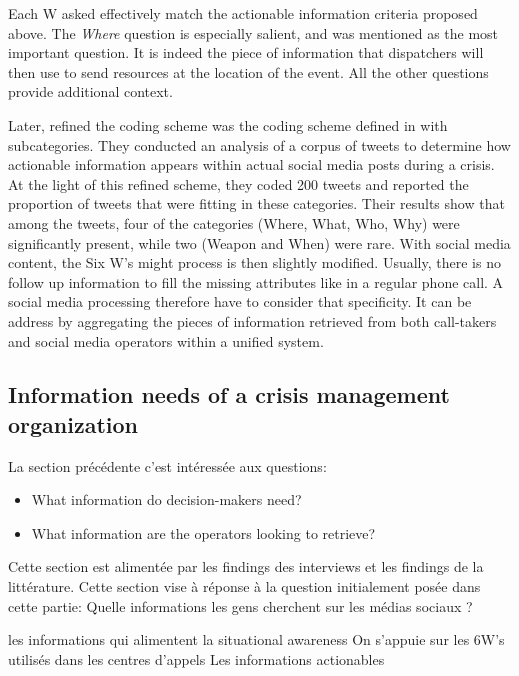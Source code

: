 Each W asked effectively match the actionable information criteria proposed above.
The \textit{Where} question is especially salient, and was mentioned as the most important question.
It is indeed the piece of information that dispatchers will then use to send resources at the location of the event.
All the other questions provide additional context.


Later, \textcite{kropczynskiRefiningCodingScheme2019} refined the coding scheme was the coding scheme defined in \textcite{kropczynskiIdentifyingActionableInformation2018} with subcategories.
They conducted an analysis of a corpus of tweets to determine how actionable information appears within actual social media posts during a crisis.
At the light of this refined scheme, they coded 200 tweets and reported the proportion of tweets that were fitting in these categories.
Their results show that among the tweets, four of the categories (Where, What, Who, Why) were significantly present, while two (Weapon and When) were rare.
With social media content, the Six W's might process is then slightly modified.
Usually, there is no follow up information to fill the missing attributes like in a regular phone call.
A social media processing therefore have to consider that specificity.
It can be address by aggregating the pieces of information retrieved from both call-takers and social media operators within a unified system.

\subsection{Information needs of a crisis management organization}
La section précédente c'est intéressée aux questions:
\begin{itemize}
    \item What information do decision-makers need?
    \item What information are the operators looking to retrieve?
\end{itemize}

Cette section est alimentée par les findings des interviews et les findings de la littérature.
Cette section vise à réponse à la question initialement posée dans cette partie:
Quelle informations les gens cherchent sur les médias sociaux ?

les informations qui alimentent la situational awareness
On s'appuie sur les 6W's utilisés dans les centres d'appels
Les informations actionables

